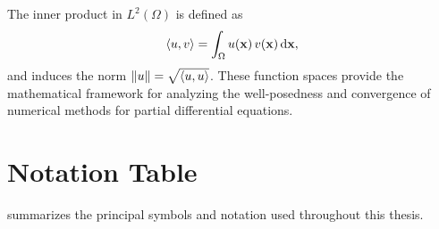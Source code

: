 The inner product in $L^2(\Omega)$ is defined as
\begin{equation}
    \left\langle u, v \right\rangle = \int_\Omega u(\mathbf{x}) \, v(\mathbf{x}) \, \mathrm{d}\mathbf{x},
    \label{eq:inner}
\end{equation}
and induces the norm $\left\| u \right\| = \sqrt{\left\langle u, u \right\rangle}$. These function spaces provide the mathematical framework for analyzing the well-posedness and convergence of numerical methods for partial differential equations.

\section{Notation Table}
\label{sec:introduction:notation_table}

 summarizes the principal symbols and notation used throughout this thesis.

